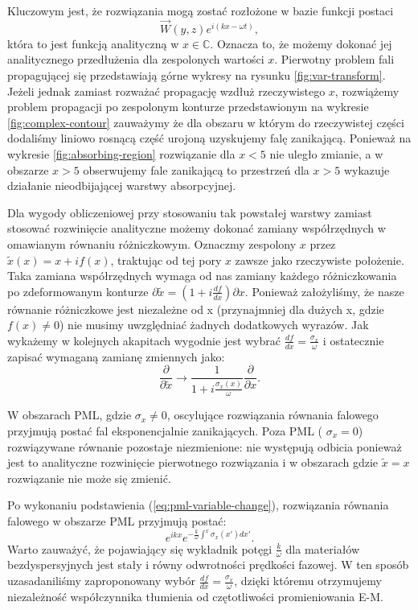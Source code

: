 Kluczowym jest, że rozwiązania mogą zostać rozłożone w bazie funkcji postaci
\begin{equation}
\vec{W}(y,z)e^{i(kx-\omega t)},
\end{equation}
która to jest funkcją analityczną w $x\in \mathbb{C}$. Oznacza to, że możemy dokonać jej analitycznego przedłużenia dla zespolonych wartości $x$. Pierwotny problem fali propagującej się przedstawiają górne wykresy na rysunku \ref{fig:var-transform}. Jeżeli jednak zamiast rozważać propagację wzdłuż rzeczywistego $x$, rozwiążemy problem propagacji po zespolonym konturze przedstawionym na wykresie \ref{fig:complex-contour} zauważymy że dla obszaru w którym do rzeczywistej części dodaliśmy liniowo rosnącą część urojoną uzyskujemy falę zanikającą. Ponieważ na wykresie \ref{fig:absorbing-region} rozwiązanie dla $x<5$ nie uległo zmianie, a w obszarze $x>5$ obserwujemy fale zanikającą to przestrzeń dla $x>5$ wykazuje działanie nieodbijającej warstwy absorpcyjnej.

Dla wygody obliczeniowej przy stosowaniu tak powstałej warstwy zamiast stosować rozwinięcie analityczne możemy dokonać zamiany współrzędnych w omawianym równaniu różniczkowym. Oznaczmy zespolony $x$ przez $\tilde{x}(x)=x+if(x)$, traktując od tej pory $x$ zawsze jako rzeczywiste położenie. Taka zamiana współrzędnych wymaga od nas zamiany każdego różniczkowania po zdeformowanym konturze $\partial \tilde{x} = (1+i\frac{df}{dx}) \partial x$. Ponieważ założyliśmy, że nasze równanie różniczkowe jest niezależne od x (przynajmniej dla dużych x, gdzie $f(x)\ne0$) nie musimy uwzględniać żadnych dodatkowych wyrazów. Jak wykażemy w kolejnych akapitach wygodnie jest wybrać $\frac{df}{dx}=\frac{\sigma_x}{\omega}$ i ostatecznie zapisać wymaganą zamianę zmiennych jako:
\begin{equation}
	\frac{\partial}{\partial \tilde{x}} \to \frac{1} {1+i \frac{\sigma_x(x)}{\omega}} \frac{\partial}{\partial x}.
	\label{eq:pml-variable-change}
\end{equation}

W obszarach PML, gdzie $\sigma_x\ne0$, oscylujące rozwiązania równania falowego przyjmują postać fal eksponencjalnie zanikających. Poza PML ( $\sigma_x=0$) rozwiązywane równanie pozostaje niezmienione: nie występują odbicia ponieważ jest to analityczne rozwinięcie pierwotnego rozwiązania i w obszarach gdzie $\tilde{x}=x$ rozwiązanie nie może się zmienić.

Po wykonaniu podstawienia (\ref{eq:pml-variable-change}), rozwiązania równania falowego w obszarze PML przyjmują postać:
\begin{equation}
e^{ikx}e^{-\frac{k}{\omega}\int^x \sigma_x(x')dx'}.
\end{equation}
Warto zauważyć, że pojawiający się wykładnik potęgi $\frac{k}{\omega}$ dla materiałów bezdyspersyjnych jest stały i równy odwrotności prędkości fazowej. W ten sposób uzasadaniliśmy zaproponowany wybór $\frac{df}{dx}=\frac{\sigma_x}{\omega}$, dzięki któremu otrzymujemy niezależność współczynnika tłumienia od czętotliwości promieniowania E-M. 

